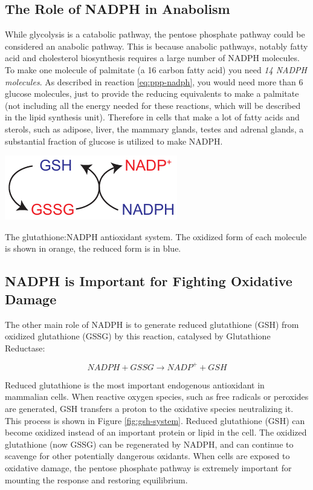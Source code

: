 \documentclass{tufte-handout}
\begin{document}
\subsection{The Role of NADPH in Anabolism}
While glycolysis is a catabolic pathway, the pentose phosphate pathway could be considered an anabolic pathway.  This is because anabolic pathways, notably fatty acid and cholesterol biosynthesis requires a large number of NADPH molecules.  To make one molecule of palmitate (a 16 carbon fatty acid) you need \emph{14 NADPH molecules}.  As described in reaction \ref{eq:ppp-nadph}, you would need more than 6 glucose molecules, just to provide the reducing equivalents to make a palmitate (not including all the energy needed for these reactions, which will be described in the lipid synthesis unit).  Therefore in cells that make a lot of fatty acids and sterols, such as adipose, liver, the mammary glands, testes and adrenal glands, a substantial fraction of glucose is utilized to make NADPH.

\begin{marginfigure}
\includegraphics{figures/gsh-nadph.pdf}
\caption{The glutathione:NADPH antioxidant system.  The oxidized form of each molecule is shown in orange, the reduced form is in blue.}
\label{fig:gsh-system}
\end{marginfigure}

\subsection{NADPH is Important for Fighting Oxidative Damage}

The other main role of NADPH is to generate reduced glutathione (GSH) from oxidized glutathione (GSSG) by this reaction, catalysed by Glutathione Reductase:

\begin{equation}
NADPH + GSSG \rightarrow NADP^+ + GSH
\end{equation}

Reduced glutathione is the most important endogenous antioxidant in mammalian cells.  When reactive oxygen species, such as free radicals or peroxides are generated, GSH transfers a proton to the oxidative species neutralizing it.  This process is shown in Figure \ref{fig:gsh-system}. Reduced glutathione (GSH) can become oxidized instead of an important protein or lipid in the cell.  The oxidized glutathione (now GSSG) can be regenerated by NADPH, and can continue to scavenge for other potentially dangerous oxidants.  When cells are exposed to oxidative damage, the pentose phosphate pathway is extremely important for mounting the response and restoring equilibrium.
\end{document}
